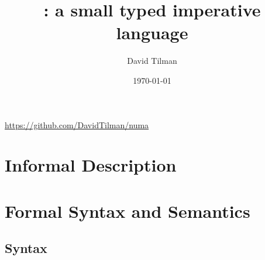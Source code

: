 \documentclass[11pt,a4paper]{article}
\title{\langname: a small typed imperative language}
\author{David Tilman}
\date{\today}
\newcommand{\giturl}{https://github.com/DavidTilman/numa}
\begin{document}
\maketitle

\begin{center}
  \url{\giturl}
\end{center}

\section{Informal Description}


\section{Formal Syntax and Semantics}

\subsection{Syntax}
\end{document}
